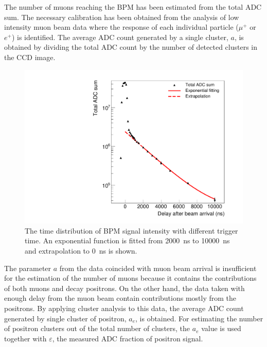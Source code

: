\documentclass[preprint,3p,twocolumn]{elsarticle}
\begin{document}
The number of muons reaching the BPM has been estimated from the total ADC sum. The necessary calibration has been obtained from the analysis of low intensity muon beam data where the response of each individual particle ($\mu^+$ or $e^+$) is identified. The average ADC count generated by a single cluster, $a$, is obtained by dividing the total ADC count by the number of detected clusters in the CCD image.
\begin{figure}[btp]
	\centering
	\includegraphics[width=\columnwidth]{figure/Decay_v3.pdf}
	\caption{The time distribution of BPM signal intensity with different trigger time. An exponential function is fitted from \SI{2000}{\ns} to \SI{10000}{\ns} and extrapolation to \SI{0}{\ns} is shown.}
	\label{fig:time_distribution}
\end{figure}

The parameter $a$ from the data coincided with muon beam arrival is insufficient for the estimation of the number of muons because it contains the contributions of both muons and decay positrons. On the other hand, the data taken with enough delay from the muon beam contain contributions mostly from the positrons. By applying cluster analysis to this data, the average ADC count generated by single cluster of positron, $a_e$, is obtained. For estimating the number of positron clusters out of the total number of clusters, the $a_e$ value is used together with $\varepsilon$, the measured ADC fraction of positron signal.
\end{document}
